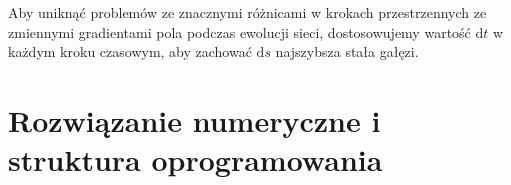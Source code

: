 \documentclass[]{pracamgr}
\begin{document}
      Aby uniknąć problemów ze znacznymi różnicami w krokach przestrzennych ze zmiennymi gradientami pola podczas ewolucji sieci, dostosowujemy wartość $\textrm{d}t$ w każdym kroku czasowym, aby zachować $\textrm{d}s$ najszybsza stała gałęzi.



















































  \chapter{Rozwiązanie numeryczne i struktura oprogramowania}
\end{document}
